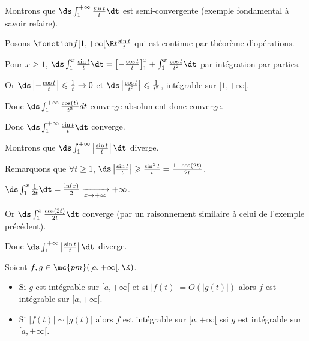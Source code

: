 \begin{exemple}
    Montrons que $\ds \int_{1 }^{+ \infty   } \frac{\sin t }{t } \dt$ est semi-convergente (exemple fondamental à savoir refaire). 


    Posons $\fonction f {[1, + \infty[}{\R}{t}{\frac{\sin t}{t}}$ qui est continue par théorème d'opérations.

    Pour $x \geqslant 1$, $\ds \int_{1 }^{x } \frac{\sin t}{t} \dt = \left[ - \frac{\cos t}{t} \right]_1^x + \int_1^x \frac{\cos t}{t^2} \dt$
    par intégration par parties.

    Or $\ds \left| -\frac{\cos t}{t} \right| \leqslant \frac{1}{t} \to 0$ 
    et $\ds \left| \frac{\cos t}{t^2} \right| \leqslant \frac{1}{t^2}$, intégrable sur $[1, + \infty[$.

    Donc $\ds \int_1^{+\infty} \frac{\cos(t)}{t^2} dt$ converge absolument donc converge.

    Donc $\ds \int_{1 }^{+ \infty   } \frac{\sin t }{t } \dt$ converge.


    Montrons que $\ds \int_{1 }^{+ \infty   } \left| \frac{\sin t }{t } \right| \dt$ diverge.

    Remarquons que $\forall t \geqslant 1$, $\ds \left| \frac{\sin t}{t} \right| \geqslant \frac{\sin^2 t}{t} = \frac{1 - \cos(2t)}{2t}$.

    $\ds \int_{1}^{x } \frac 1 {2t} \dt = \frac{\ln(x)}{2} \xrightarrow[x \to + \infty   ]{} + \infty$.

    Or $\ds \int_{1}^{x } \frac{\cos(2t)}{2t} \dt$ converge (par un raisonnement similaire à celui de l'exemple précédent).

    Donc $\ds \int_{1 }^{+ \infty   } \left| \frac{\sin t }{t } \right| \dt$ diverge.
\end{exemple}



\begin{theoreme}{}{}
    Soient $f, g \in \mc{pm}([a, + \infty[, \K)$. 

    \begin{itemize}
        \item Si $g$ est intégrable sur $[a, + \infty[$ et si $|f(t)| = O(|g(t)|)$ alors $f$ est 
        intégrable sur $[a, + \infty[$.
        \item Si $|f(t)| \sim |g(t)|$ alors $f$ est intégrable sur $[a, + \infty[$ ssi $g$ est intégrable sur $[a, + \infty[$.
    \end{itemize}
\end{theoreme}

